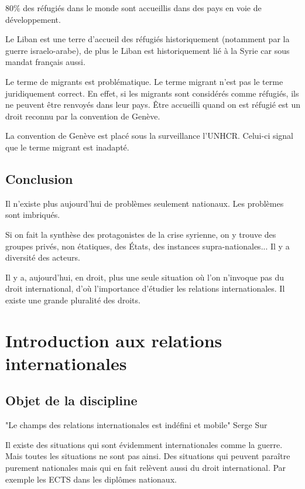 ﻿\documentclass[12pt, a4paper, openany]{book}
\begin{document}
80\% des réfugiés dans le monde sont accueillis dans des pays en voie de développement. 

Le Liban est une terre d'accueil des réfugiés historiquement (notamment par la guerre israelo-arabe), de plus le Liban est historiquement lié à la Syrie car sous mandat français aussi.

Le terme de migrants est problématique. Le terme migrant n'est pas le terme juridiquement correct. En effet, si les migrants sont considérés comme réfugiés, ils ne peuvent être renvoyés dans leur pays. Être accueilli quand on est réfugié est un droit reconnu par la convention de Genève.

La convention de Genève est placé sous la surveillance l'UNHCR. Celui-ci signal que le terme migrant est inadapté.  

\section{Conclusion}

Il n'existe plus aujourd'hui de problèmes seulement nationaux. Les problèmes sont imbriqués. 

Si on fait la synthèse des protagonistes de la crise syrienne, on y trouve des groupes privés, non étatiques, des États, des instances supra-nationales... Il y a diversité des acteurs.


Il y a, aujourd'hui, en droit, plus une seule situation où l'on n'invoque pas du droit international, d'où l'importance d'étudier les relations internationales. Il existe une grande pluralité des droits. 

\chapter{Introduction aux relations internationales}

	\section{Objet de la discipline}
	
"Le champs des relations internationales est indéfini et mobile" Serge Sur

Il existe des situations qui sont évidemment internationales comme la guerre. Mais toutes les situations ne sont pas ainsi. Des situations qui peuvent paraître purement nationales mais qui en fait relèvent aussi du droit international. Par exemple les ECTS dans les diplômes nationaux.
\end{document}
